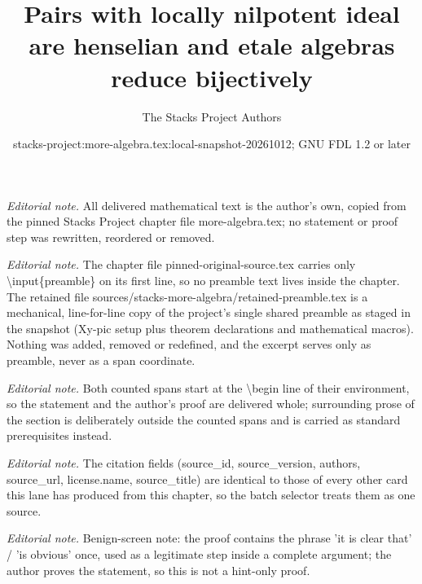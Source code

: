 \documentclass[10pt,a4paper]{amsart}
\title{Pairs with locally nilpotent ideal are henselian and etale algebras reduce bijectively}
\author{The Stacks Project Authors}
\date{stacks-project:more-algebra.tex:local-snapshot-20261012; GNU FDL 1.2 or later}
\theoremstyle{plain}
\theoremstyle{definition}
\theoremstyle{remark}
\numberwithin{equation}{subsection}
\begin{document}
\maketitle
\setcounter{subsection}{1}
\noindent\textit{Editorial note.} All delivered mathematical text is the author's own, copied from the pinned Stacks Project chapter file more-algebra.tex; no statement or proof step was rewritten, reordered or removed.\par\medskip
\noindent\textit{Editorial note.} The chapter file pinned-original-source.tex carries only \textbackslash{}input\{preamble\} on its first line, so no preamble text lives inside the chapter. The retained file sources/stacks-more-algebra/retained-preamble.tex is a mechanical, line-for-line copy of the project's single shared preamble as staged in the snapshot (Xy-pic setup plus theorem declarations and mathematical macros). Nothing was added, removed or redefined, and the excerpt serves only as preamble, never as a span coordinate.\par\medskip
\noindent\textit{Editorial note.} Both counted spans start at the \textbackslash{}begin line of their environment, so the statement and the author's proof are delivered whole; surrounding prose of the section is deliberately outside the counted spans and is carried as standard prerequisites instead.\par\medskip
\noindent\textit{Editorial note.} The citation fields (source\_id, source\_version, authors, source\_url, license.name, source\_title) are identical to those of every other card this lane has produced from this chapter, so the batch selector treats them as one source.\par\medskip
\noindent\textit{Editorial note.} Benign-screen note: the proof contains the phrase 'it is clear that' / 'is obvious' once, used as a legitimate step inside a complete argument; the author proves the statement, so this is not a hint-only proof.\par\medskip
\end{document}
